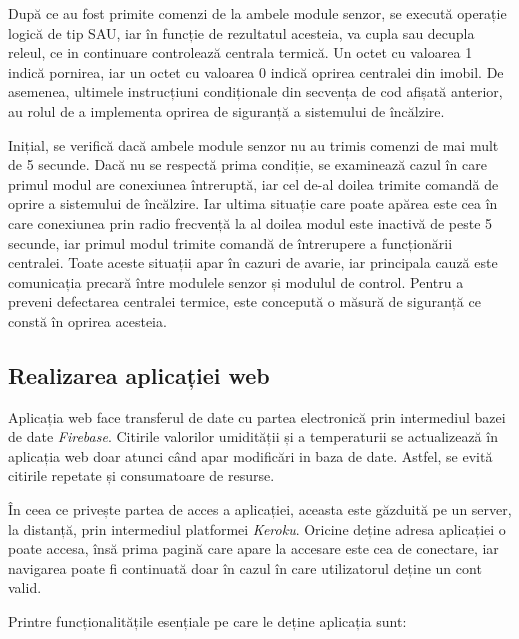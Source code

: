 	După ce au fost primite comenzi de la ambele module senzor, se execută operație logică de tip SAU, iar în funcție de rezultatul acesteia, va cupla sau decupla releul, ce in continuare controlează centrala termică. Un octet cu valoarea 1 indică pornirea, iar un octet cu valoarea 0 indică oprirea centralei din imobil. De asemenea, ultimele instrucțiuni condiționale din secvența de cod afișată anterior, au rolul de a implementa oprirea de siguranță a sistemului de încălzire. 

	Inițial, se verifică dacă ambele module senzor nu au trimis comenzi de mai mult de 5 secunde. Dacă nu se respectă prima condiție, se examinează cazul în care primul modul are conexiunea întreruptă, iar cel de-al doilea trimite comandă de oprire a sistemului de încălzire. Iar ultima situație care poate apărea este cea în care conexiunea prin radio frecvență la al doilea modul este inactivă de peste 5 secunde, iar primul modul trimite comandă de întrerupere a funcționării centralei. Toate aceste situații apar în cazuri de avarie, iar principala cauză este comunicația precară între modulele senzor și modulul de control. Pentru a preveni defectarea centralei termice, este concepută o măsură de siguranță ce constă în oprirea acesteia.  

\subsection{Realizarea aplicației web}

	Aplicația web face transferul de date cu partea electronică prin intermediul bazei de date \textit{Firebase}. Citirile valorilor umidității și a temperaturii se actualizează în aplicația web doar atunci când apar modificări in baza de date. Astfel, se evită citirile repetate și consumatoare de resurse.
	
	În ceea ce privește partea de acces a aplicației, aceasta este găzduită pe un server, la distanță, prin intermediul platformei \textit{Keroku}. Oricine deține adresa aplicației o poate accesa, însă prima pagină care apare la accesare este cea de conectare, iar navigarea poate fi continuată doar în cazul în care utilizatorul deține un cont valid. 
	
\vspace{1em}
	Printre funcționalitățile esențiale pe care le deține aplicația sunt:

